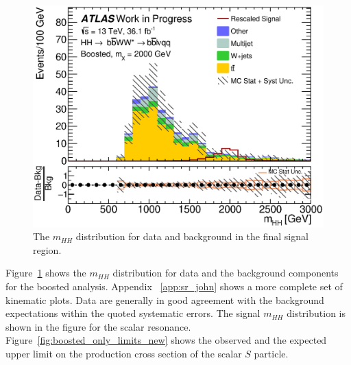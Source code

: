 




\begin{figure}[h]
\begin{center}
\includegraphics[scale=0.65]{figures/kinplots/C_2tag_SR_lepton_presel_met50_hhMassRebin1}
\caption{The ${m_{HH}}$ distribution for data and background in the final signal region.}
\label{fig:fully_boost_mhh}
\end{center}
\end{figure}


Figure~\ref{fig:fully_boost_mhh} shows the $m_{HH}$ distribution for
data and the background components for the boosted analysis. Appendix ~\ref{app:sr_john} shows a more complete set of kinematic plots. 
Data are generally in good agreement with the background expectations within the quoted systematic errors.
The signal $m_{HH}$ distribution is shown in the figure for  the scalar resonance.
Figure~\ref{fig:boosted_only_limits_new} shows the observed and the expected
upper limit on the production cross section of the scalar $S$ particle.

